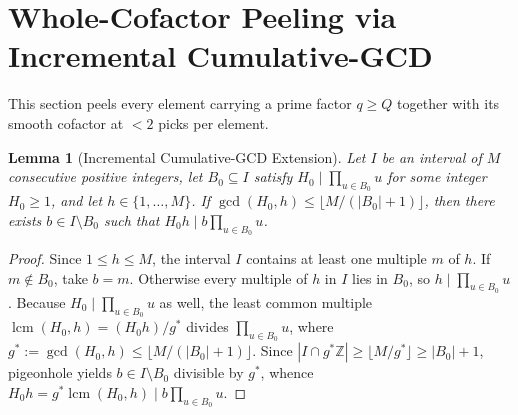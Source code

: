 \documentclass[11pt]{article}
\newtheorem{lemma}[theorem]{Lemma}
\theoremstyle{remark}
\DeclareMathOperator{\lcm}{lcm}
\begin{document}
\section{Whole-Cofactor Peeling via Incremental Cumulative-GCD}

This section peels every element carrying a prime factor $q \ge Q$ together with its smooth cofactor at $< 2$ picks per element.

\begin{lemma}[Incremental Cumulative-GCD Extension]
\label{lem:cgcd}
Let $I$ be an interval of $M$ consecutive positive integers, let $B_0 \subseteq I$ satisfy $H_0 \mid \prod_{u \in B_0} u$ for some integer $H_0 \ge 1$, and let $h \in \{1, \dots, M\}$. If $\gcd(H_0, h) \le \lfloor M / (|B_0| + 1) \rfloor$, then there exists $b \in I \setminus B_0$ such that $H_0 h \mid b \prod_{u \in B_0} u$.
\end{lemma}
\begin{proof}
Since $1 \le h \le M$, the interval $I$ contains at least one multiple $m$ of $h$. If $m \notin B_0$, take $b = m$. Otherwise every multiple of $h$ in $I$ lies in $B_0$, so $h \mid \prod_{u \in B_0} u$. Because $H_0 \mid \prod_{u \in B_0} u$ as well, the least common multiple $\lcm(H_0, h) = (H_0 h) / g^*$ divides $\prod_{u \in B_0} u$, where $g^* := \gcd(H_0, h) \le \lfloor M / (|B_0| + 1) \rfloor$. Since $|I \cap g^* \mathbb{Z}| \ge \lfloor M / g^* \rfloor \ge |B_0| + 1$, pigeonhole yields $b \in I \setminus B_0$ divisible by $g^*$, whence $H_0 h = g^* \lcm(H_0, h) \mid b \prod_{u \in B_0} u$.
\end{proof}
\end{document}
